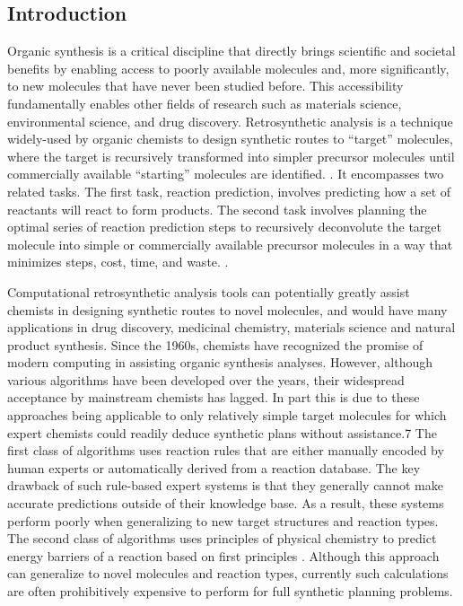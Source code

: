\subsection{Introduction}
Organic synthesis is a critical discipline that directly brings scientific and societal benefits by enabling access to poorly available molecules and, more significantly, to new molecules that have never been studied before. This accessibility fundamentally enables other fields of research such as materials science, environmental science, and drug discovery. Retrosynthetic analysis is a technique widely-used by organic chemists to design synthetic routes to “target” molecules, where the target is recursively transformed into simpler precursor molecules until commercially available “starting” molecules are identified. \cite{corey1989logic, corey1967general, corey1967general}. It encompasses two related tasks. The first task, reaction prediction, involves predicting how a set of reactants will react to form products. The second task involves planning the optimal series of reaction prediction steps to recursively deconvolute the target molecule into simple or commercially available precursor molecules in a way that minimizes steps, cost, time, and waste. \cite{wender2014toward, wender2015function}.

Computational retrosynthetic analysis tools can potentially greatly assist chemists in designing synthetic routes to novel molecules, and would have many applications in drug discovery, medicinal chemistry, materials science and natural product synthesis. Since the 1960s, chemists have recognized the promise of modern computing in assisting organic synthesis analyses. However, although various algorithms have been developed over the years, their widespread acceptance by mainstream chemists has lagged\cite{ley2015organic}. In part this is due to these approaches being applicable to only relatively simple target molecules for which expert chemists could readily deduce synthetic plans without assistance.7 The first class of algorithms uses reaction rules that are either manually encoded by human experts or automatically derived from a reaction database. \cite{szymkuc2016computer, segler2017modelling} The key drawback of such rule-based expert systems is that they generally cannot make accurate predictions outside of their knowledge base. As a result, these systems perform poorly when generalizing to new target structures and reaction types. The second class of algorithms uses principles of physical chemistry to predict energy barriers of a reaction based on first principles \cite{zimmerman2013automated, martinez2017ab}. Although this approach can generalize to novel molecules and reaction types, currently such calculations are often prohibitively expensive to perform for full synthetic planning problems.

